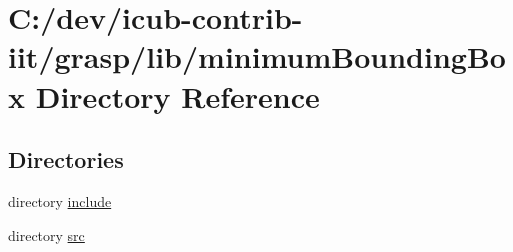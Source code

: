 \section{C\+:/dev/icub-\/contrib-\/iit/grasp/lib/minimum\+Bounding\+Box Directory Reference}
\label{dir_ed606719c7db51b3b009f197b88dba3b}
\subsection*{Directories}
\begin{DoxyCompactItemize}
\item 
directory \hyperlink{dir_40c82b377ee2f2260824bc8bd89d90af}{include}
\item 
directory \hyperlink{dir_04d7bfefd4c58779af18d00cdc602db5}{src}
\end{DoxyCompactItemize}
